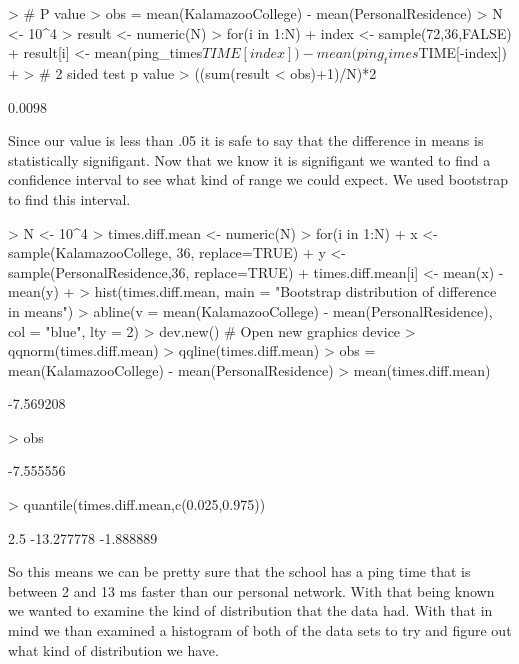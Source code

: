 \documentclass{article}
\begin{document}
\begin{Schunk}
\begin{Sinput}
> # P value
> obs = mean(KalamazooCollege) - mean(PersonalResidence)
> N <- 10^4
> result <- numeric(N)
> for(i in 1:N){
+   index <- sample(72,36,FALSE)
+   result[i] <- mean(ping_times$TIME[index]) - mean(ping_times$TIME[-index])
+ }
> # 2 sided test p value
> ((sum(result < obs)+1)/N)*2
\end{Sinput}
\begin{Soutput}
[1] 0.0098
\end{Soutput}
\end{Schunk}
Since our value is less than .05 it is safe to say that the difference in means is statistically signifigant.  Now that we know it is signifigant we wanted to find a confidence interval to see what kind of range we could expect.  We used bootstrap to find this interval.

\begin{Schunk}
\begin{Sinput}
> N <- 10^4
> times.diff.mean <- numeric(N)
> for(i in 1:N){
+   x <- sample(KalamazooCollege, 36, replace=TRUE)
+   y <- sample(PersonalResidence,36, replace=TRUE)
+   times.diff.mean[i] <- mean(x) - mean(y)
+ }
> hist(times.diff.mean, main = "Bootstrap distribution of difference in means") 
> abline(v = mean(KalamazooCollege) - mean(PersonalResidence), col = "blue", lty = 2)
> dev.new() # Open new graphics device 
> qqnorm(times.diff.mean) 
> qqline(times.diff.mean)
> obs = mean(KalamazooCollege) - mean(PersonalResidence)
> mean(times.diff.mean)
\end{Sinput}
\begin{Soutput}
[1] -7.569208
\end{Soutput}
\begin{Sinput}
> obs
\end{Sinput}
\begin{Soutput}
[1] -7.555556
\end{Soutput}
\begin{Sinput}
> quantile(times.diff.mean,c(0.025,0.975))
\end{Sinput}
\begin{Soutput}
      2.5%      97.5% 
-13.277778  -1.888889 
\end{Soutput}
\end{Schunk}

So this means we can be pretty sure that the school has a ping time that is between 2 and 13 ms faster than our personal network.  With that being known we wanted to examine the kind of distribution that the data had.  With that in mind we than examined a histogram of both of the data sets to try and figure out what kind of distribution we have.
\end{document}

